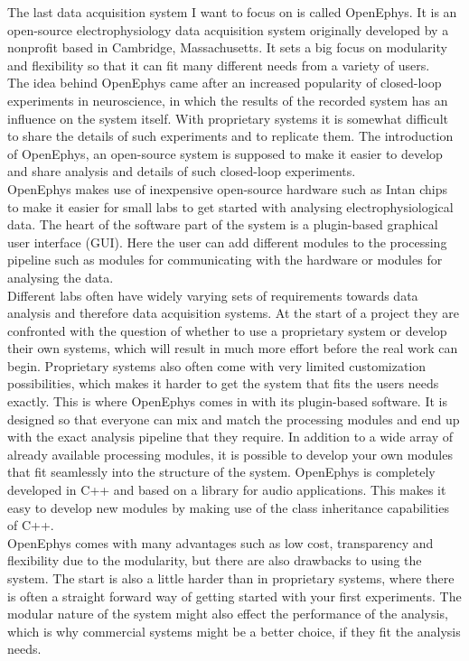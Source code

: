 The last data acquisition system I want to focus on is called OpenEphys. It is an open-source electrophysiology data acquisition system originally developed by a nonprofit based in Cambridge, Massachusetts. It sets a big focus on modularity and flexibility so that it can fit many different needs from a variety of users.\\

The idea behind OpenEphys came after an increased popularity of closed-loop experiments in neuroscience, in which the results of the recorded system has an influence on the system itself. With proprietary systems it is somewhat difficult to share the details of such experiments and to replicate them. The introduction of OpenEphys, an open-source system is supposed to make it easier to develop and share analysis and details of such closed-loop experiments.\\
OpenEphys makes use of inexpensive open-source hardware such as Intan chips to make it easier for small labs to get started with analysing electrophysiological data. The heart of the software part of the system is a plugin-based graphical user interface (GUI). Here the user can add different modules to the processing pipeline such as modules for communicating with the hardware or modules for analysing the data.\\
Different labs often have widely varying sets of requirements towards data analysis and therefore data acquisition systems. At the start of a project they are confronted with the question of whether to use a proprietary system or develop their own systems, which will result in much more effort before the real work can begin. Proprietary systems also often come with very limited customization possibilities, which makes it harder to get the system that fits the users needs exactly. This is where OpenEphys comes in with its plugin-based software. It is designed so that everyone can mix and match the processing modules and end up with the exact analysis pipeline that they require. In addition to a wide array of already available processing modules, it is possible to develop your own modules that fit seamlessly into the structure of the system. OpenEphys is completely developed in C++ and based on a library for audio applications. This makes it easy to develop new modules by making use of the class inheritance capabilities of C++.\\
OpenEphys comes with many advantages such as low cost, transparency and flexibility due to the modularity, but there are also drawbacks to using the system. The start is also a little harder than in proprietary systems, where there is often a straight forward way of getting started with your first experiments. The modular nature of the system might also effect the performance of the analysis, which is why commercial systems might be a better choice, if they fit the analysis needs.\\

